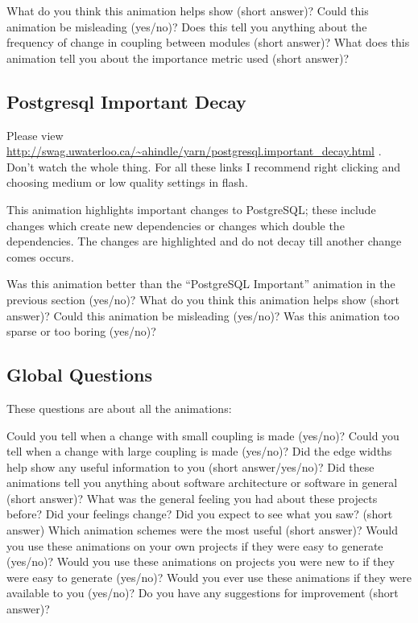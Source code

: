 \documentclass{article}
\begin{document}
\begin{itemize}
\qitem What do you think this animation helps show (short answer)?
\qitem Could this animation be misleading (yes/no)?
\qitem Does this tell you anything about the frequency of change in coupling between modules (short answer)?
\qitem What does this animation tell you about the importance metric used (short answer)?
\end{itemize}

\subsection{Postgresql Important Decay}
Please view
\url{http://swag.uwaterloo.ca/~ahindle/yarn/postgresql.important_decay.html}
.  Don't watch the whole thing. For all these links I recommend right
clicking and choosing medium or low quality settings in flash.

This animation highlights important changes to PostgreSQL; these
include changes which create new dependencies or changes which double
the dependencies. The changes are highlighted and do not decay till
another change comes occurs.

\begin{itemize}
\qitem Was this animation better than the ``PostgreSQL Important'' animation in the previous section (yes/no)?
\qitem What do you think this animation helps show (short answer)?
\qitem Could this animation be misleading (yes/no)?
\qitem Was this animation too sparse or too boring (yes/no)?
\end{itemize}

\subsection{Global Questions}

These questions are about all the animations:

\begin{itemize}
\qitem Could you tell when a change with small coupling is made (yes/no)?
\qitem Could you tell when a change with large coupling is made (yes/no)?
\qitem Did the edge widths help show any useful information to you (short answer/yes/no)?
\qitem Did these animations tell you anything about software architecture or software in general (short answer)?
\qitem What was the general feeling you had about these projects before? Did your feelings change? Did you expect to see what you saw? (short answer)
\qitem Which animation schemes were the most useful (short answer)?
\qitem Would you use these animations on your own projects if they were easy to generate (yes/no)?
\qitem Would you use these animations on projects you were new to if they were easy to generate (yes/no)?
\qitem Would you ever use these animations if they were available to you (yes/no)?
\qitem Do you have any suggestions for improvement (short answer)?
\end{itemize}
\end{document}
